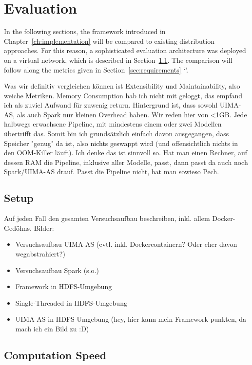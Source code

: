 \chapter{Evaluation}
\label{ch:evaluation}
In the following sections, the framework introduced in Chapter~\ref{ch:implementation} will be compared to existing \uima{} distribution approaches. For this reason, a sophisticated evaluation architecture was deployed on a virtual network, which is described in Section~\ref{sec:setup}. The comparison will follow along the metrics given in Section~\ref{sec:requirements} `'.


Was wir definitiv vergleichen können ist Extensibility und Maintainability, also weiche Metriken. Memory Consumption hab ich nicht mit geloggt, das empfand ich als zuviel Aufwand für zuwenig return. Hintergrund ist, dass sowohl UIMA-AS, als auch Spark nur kleinen Overhead haben. Wir reden hier von <1GB. Jede halbwegs erwachsene Pipeline, mit mindestens einem oder zwei Modellen übertrifft das. Somit bin ich grundsätzlich einfach davon ausgegangen, dass Speicher "genug" da ist, also nichts geswappt wird (und offensichtlich nichts in den OOM-Killer läuft). Ich denke das ist sinnvoll so. Hat man einen Rechner, auf dessen RAM die Pipeline, inklusive aller Modelle, passt, dann passt da auch noch Spark/UIMA-AS drauf. Passt die Pipeline nicht, hat man sowieso Pech.

\section{Setup}
\label{sec:setup}



Auf jeden Fall den gesamten Versuchsaufbau beschreiben, inkl. allem Docker-Gedöhns. 
Bilder:
\begin{itemize}
	\item Versuchsaufbau UIMA-AS (evtl. inkl. Dockercontainern? Oder eher davon wegabstrahiert?)
	\item Versuchsaufbau Spark (s.o.)
	\item Framework in HDFS-Umgebung
	\item Single-Threaded in HDFS-Umgebung
	\item UIMA-AS in HDFS-Umgebung (hey, hier kann mein Framework punkten, da mach ich ein Bild zu :D)
	
\end{itemize}

\section{Computation Speed}

